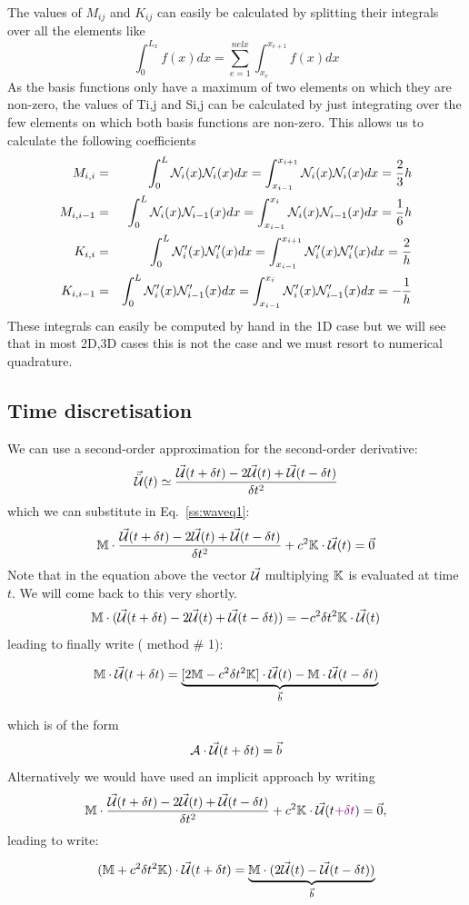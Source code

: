 The values of $M_{ij}$ and $K_{ij}$ can easily be calculated by splitting their integrals over all the elements like
\[
\int_0^{L_x} f(x) dx = \sum_{e=1}^{nelx} \int_{x_e}^{x_{e+1}} f(x) dx
\]
As the basis functions only have a maximum of two elements on which they are non-zero, the values of
Ti,j and Si,j can be calculated by just integrating over the few elements on which both basis functions are
non-zero. This allows us to calculate the following coefficients
\begin{eqnarray}
M_{i,i}&=&\int_0^L {\mathcal{N}}_i(x) {\mathcal{N}}_i(x) dx =\int_{x_{i-1}}^{x_{i+1}} {\mathcal{N}}_i(x) {\mathcal{N}}_i(x) dx = \frac23 h \nonumber\\
M_{i,i-1}&=&\int_0^L {\mathcal{N}}_i(x) {\mathcal{N}}_{i-1}(x)dx=\int_{x_{i-1}}^{x_{i}}{\mathcal{N}}_i(x) {\mathcal{N}}_{i-1}(x) dx=\frac16 h \nonumber\\
K_{i,i}&=&\int_0^L {\mathcal{N}}_i'(x){\mathcal{N}}_i'(x) dx =\int_{x_{i-1}}^{x_{i+1}} {\mathcal{N}}_i'(x) {\mathcal{N}}_i'(x) dx = \frac{2}{h}\nonumber\\
K_{i,i-1}&=&\int_0^L {\mathcal{N}}_i'(x){\mathcal{N}}_{i-1}'(x) dx =\int_{x_{i-1}}^{x_{i}} {\mathcal{N}}_i'(x) {\mathcal{N}}_{i-1}'(x) dx =-\frac{1}{h}
\end{eqnarray}
These integrals can easily be computed by hand in the 1D case but we will see that in most 2D,3D cases
this is not the case and we must resort to numerical quadrature.

\subsection{Time discretisation}

We can use a second-order approximation for the second-order derivative:
\[
\vec{\ddot{{\cal U}}}(t) \simeq  \frac{ \vec{\cal U}(t+ \delta t) -2 \vec{\cal U}(t) + \vec{\cal U}(t-\delta t)}{\delta t^2}
\]
which we can substitute in Eq.~\eqref{ss:waveq1}:
\[
{\mathbb{M}} \cdot \frac{ \vec{\cal U}(t+\delta t) -2 \vec{\cal U}(t) + \vec{\cal U}(t-\delta t)}{\delta t^2} 
+c^2 {\mathbb{K}} \cdot \vec{\cal U}(t) = \vec{0}
\]
Note that in the equation above the vector $\vec{\cal U}$ multiplying ${\mathbb{K}}$ is evaluated at time $t$. We will come back 
to this very shortly.
\[
{\mathbb{M}} \cdot ( \vec{\cal U}(t+\delta t) -2 \vec{\cal U}(t) + \vec{\cal U}(t- \delta t)) 
=- c^2 \delta t^2 {\mathbb{K}} \cdot \vec{\cal U}(t) 
\]
leading to finally write ({\color{orange} method \# 1}):
\begin{mdframed}[backgroundcolor=blue!5]
\[
{\mathbb{M}} \cdot  \vec{\cal U}(t+\delta t)
=\underbrace{ [2  {\mathbb{M}}  - c^2 \delta t^2 {\mathbb{K}}  ]  \cdot \vec{\cal U}(t) - {\mathbb{M}} \cdot \vec{\cal U}(t-\delta t)}_{\vec{b}}
\]
\end{mdframed}
which is of the form 
\[
{\cal \bm A} \cdot \vec{\cal U} (t+\delta t) = \vec{b}
\]
Alternatively we would have used an implicit approach by writing
\[
{\mathbb{M}} \cdot \frac{ \vec{\cal U}(t+\delta t) -2 \vec{\cal U}(t) + \vec{\cal U}(t-\delta t)}{\delta t^2} 
+c^2 {\mathbb{K}} \cdot \vec{\cal U}(t {\color{violet} +\delta t} ) = \vec{0},
\]
leading to write:
\begin{mdframed}[backgroundcolor=blue!5]
\[
({\mathbb{M}} + c^2 \delta t^2 {\mathbb{K}} ) \cdot \vec{\cal U}(t+\delta t) = \underbrace{ {\mathbb{M}} \cdot(2 \vec{\cal U}(t) - \vec{\cal U}(t-\delta t)) }_{\vec{b}}
\] 
\end{mdframed}

